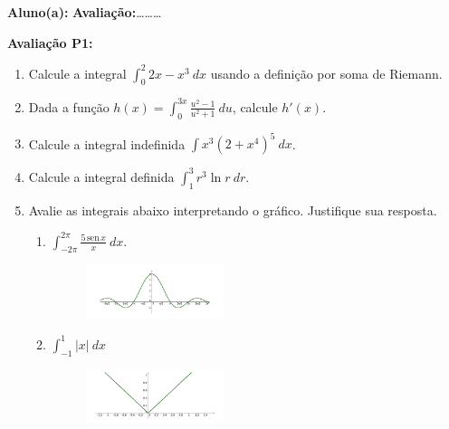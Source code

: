 \documentclass[a4paper,5pt]{amsbook}
\newcommand{\sen}{\,\mbox{sen}\,}
\newcommand{\ds}{\displaystyle}
\begin{document}
\vspace{0.5cm}
{\bf Aluno(a):}\dotfill{} \textbf{Avalia\c{c}\~ao:}\ldots{}\ldots{}\ldots{}  %

\vspace{0.5cm}
\textbf{Avalia\c{c}\~ao P1:}
\begin{enumerate}
	\vspace{0.5cm}
	\item Calcule a integral $\ds\int_0^2 2x - x^3\ dx$ usando a defini\c{c}\~ao por soma de Riemann.

	\vspace{0.5cm}
	\item Dada a fun\c{c}\~ao $\ds h(x) = \int_0^{3x} \frac{u^2-1}{u^2+1}\ du$, calcule $h'(x)$.

	\vspace{0.5cm}
	\item Calcule a integral indefinida $\ds\int x^3{(2+x^4)}^5\ dx$.

	\vspace{0.5cm}
	\item Calcule a integral definida $\ds\int_1^3 r^3\ln{r}\ dr$.

	\vspace{0.5cm}
	\item Avalie as integrais abaixo interpretando o gr\'afico. Justifique sua resposta.
		\begin{enumerate}
			\item $\ds\int_{-2\pi}^{2\pi} \frac{5\sen{x}}{x}\ dx$.
				\begin{figure}[h]
					\includegraphics[width=0.4\textwidth]{p1-5a.pdf}
				\end{figure}
			\item $\ds\int_{-1}^{1} |x|\ dx$
				\begin{figure}[h]
					\includegraphics[width=0.4\textwidth]{p1-5b.pdf}
				\end{figure}
		\end{enumerate}
\end{enumerate}
\end{document}
